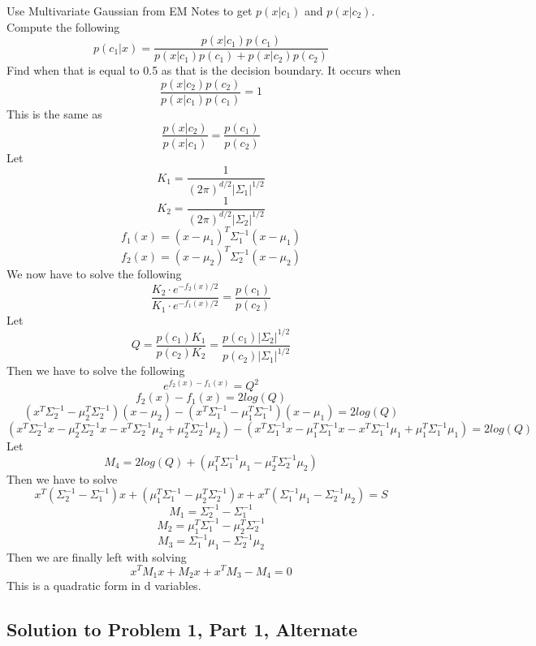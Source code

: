 \documentclass[11pt,psfig]{article}
\begin{document}
Use Multivariate Gaussian from EM Notes to get $p(x|c_1)$ and $p(x|c_2)$. Compute the following
\[
p(c_1|x) = \frac{p(x|c_1)p(c_1)}{p(x|c_1)p(c_1) + p(x|c_2)p(c_2)}
\]
Find when that is equal to 0.5 as that is the decision boundary. It occurs when
\[
\frac{p(x|c_2)p(c_2)}{p(x|c_1)p(c_1)} = 1
\]
This is the same as
\[
\frac{p(x|c_2)}{p(x|c_1)} = \frac{p(c_1)}{p(c_2)}
\]
Let
\[
K_1 = \frac{1}{(2\pi)^{d/2}|\Sigma_1|^{1/2}}
\]
\[
K_2 = \frac{1}{(2\pi)^{d/2}|\Sigma_2|^{1/2}}
\]
\[
f_1(x) = (x-\mu_1)^T \Sigma_1^{-1} (x-\mu_1)
\]
\[
f_2(x) = (x-\mu_2)^T \Sigma_2^{-1} (x-\mu_2)
\]
We now have to solve the following
\[
\frac{K_2 \cdot e^{-f_2(x)/2}}{K_1 \cdot e^{-f_1(x)/2}} = \frac{p(c_1)}{p(c_2)}
\]
Let
\[
Q = \frac{p(c_1)K_1}{p(c_2)K_2} = \frac{p(c_1)|\Sigma_2|^{1/2}}{p(c_2)|\Sigma_1|^{1/2}}
\]
Then we have to solve the following
\[
e^{f_2(x) - f_1(x)} = Q^2
\]
\[
f_2(x) - f_1(x) = 2 log(Q)
\]
\[
(x^T \Sigma_2^{-1} - \mu_2^T \Sigma_2^{-1})(x - \mu_2) - (x^T \Sigma_1^{-1} - \mu_1^T \Sigma_1^{-1})(x - \mu_1) = 2 log(Q)
\]
\[
(x^T \Sigma_2^{-1} x - \mu_2^T \Sigma_2^{-1} x - x^T \Sigma_2^{-1} \mu_2 + \mu_2^T \Sigma_2^{-1} \mu_2) - (x^T \Sigma_1^{-1} x - \mu_1^T \Sigma_1^{-1} x - x^T \Sigma_1^{-1} \mu_1 + \mu_1^T \Sigma_1^{-1} \mu_1) = 2 log(Q)
\]
Let
\[
M_4 = 2log(Q) + (\mu_1^T \Sigma_1^{-1} \mu_1 - \mu_2^T \Sigma_2^{-1} \mu_2)
\]
Then we have to solve
\[
x^T (\Sigma_2^{-1} - \Sigma_1^{-1})x + (\mu_1^T \Sigma_1^{-1} - \mu_2^T \Sigma_2^{-1}) x + x^T (\Sigma_1^{-1} \mu_1 - \Sigma_2^{-1} \mu_2) = S
\]
\[
M_1 = \Sigma_2^{-1} - \Sigma_1^{-1}
\]
\[
M_2 = \mu_1^T \Sigma_1^{-1} - \mu_2^T \Sigma_2^{-1}
\]
\[
M_3 = \Sigma_1^{-1} \mu_1 - \Sigma_2^{-1} \mu_2
\]
Then we are finally left with solving
\[
x^T M_1 x + M_2 x + x^T M_3 - M_4 = 0
\]
This is a quadratic form in d variables. 

\subsection*{Solution to Problem 1, Part 1, Alternate}
\end{document}
